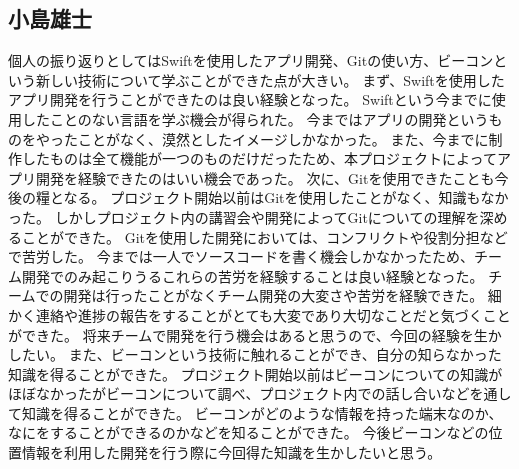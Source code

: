 \documentclass[openany,11pt,papersize]{jsbook}
\begin{document}
\subsection{小島雄士}
個人の振り返りとしてはSwiftを使用したアプリ開発、Gitの使い方、ビーコンという新しい技術について学ぶことができた点が大きい。
まず、Swiftを使用したアプリ開発を行うことができたのは良い経験となった。
Swiftという今までに使用したことのない言語を学ぶ機会が得られた。
今まではアプリの開発というものをやったことがなく、漠然としたイメージしかなかった。
また、今までに制作したものは全て機能が一つのものだけだったため、本プロジェクトによってアプリ開発を経験できたのはいい機会であった。
次に、Gitを使用できたことも今後の糧となる。
プロジェクト開始以前はGitを使用したことがなく、知識もなかった。
しかしプロジェクト内の講習会や開発によってGitについての理解を深めることができた。
Gitを使用した開発においては、コンフリクトや役割分担などで苦労した。
今までは一人でソースコードを書く機会しかなかったため、チーム開発でのみ起こりうるこれらの苦労を経験することは良い経験となった。
チームでの開発は行ったことがなくチーム開発の大変さや苦労を経験できた。
細かく連絡や進捗の報告をすることがとても大変であり大切なことだと気づくことができた。
将来チームで開発を行う機会はあると思うので、今回の経験を生かしたい。
また、ビーコンという技術に触れることができ、自分の知らなかった知識を得ることができた。
プロジェクト開始以前はビーコンについての知識がほぼなかったがビーコンについて調べ、プロジェクト内での話し合いなどを通して知識を得ることができた。
ビーコンがどのような情報を持った端末なのか、なにをすることができるのかなどを知ることができた。
今後ビーコンなどの位置情報を利用した開発を行う際に今回得た知識を生かしたいと思う。
\end{document}
